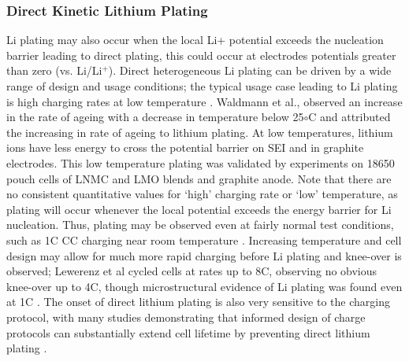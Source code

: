 \documentclass{article}
\begin{document}
\subsubsection{Direct Kinetic Lithium Plating}
Li plating may also occur when the local Li+ potential exceeds the nucleation barrier leading to direct plating, this could occur at electrodes potentials greater than zero (vs. Li/Li$\mathrm{^+}$). Direct heterogeneous Li plating can be driven by a wide range of design and usage conditions; the typical usage case leading to Li plating is high charging rates at low temperature \cite{waldmann_temperature_2014, petzl_lithium_2015}. Waldmann et al.,\cite{waldmann_temperature_2014} observed an increase in the rate of ageing with a decrease in temperature below 25$\circ$C and attributed the increasing in rate of ageing to lithium plating. At low temperatures, lithium ions have less energy to cross the potential barrier on SEI and in graphite electrodes. This low temperature plating was validated by experiments on 18650 pouch cells of LNMC and LMO blends and graphite anode. Note that there are no consistent quantitative values for ‘high’ charging rate or ‘low’ temperature, as plating will occur whenever the local potential exceeds the energy barrier for Li nucleation. Thus, plating may be observed even at fairly normal test conditions, such as 1C CC charging near room temperature \cite{waldmann_optimization_2015,burns_-situ_2015}. Increasing temperature and cell design may allow for much more rapid charging before Li plating and knee-over is observed; Lewerenz et al cycled cells at rates up to 8C, observing no obvious knee-over up to 4C, though microstructural evidence of Li plating was found even at 1C \cite{lewerenz_systematic_2017}. The onset of direct lithium plating is also very sensitive to the charging protocol, with many studies demonstrating that informed design of charge protocols can substantially extend cell lifetime by preventing direct lithium plating \cite{waldmann_optimization_2015,schindler_fast_2018}.
\end{document}
